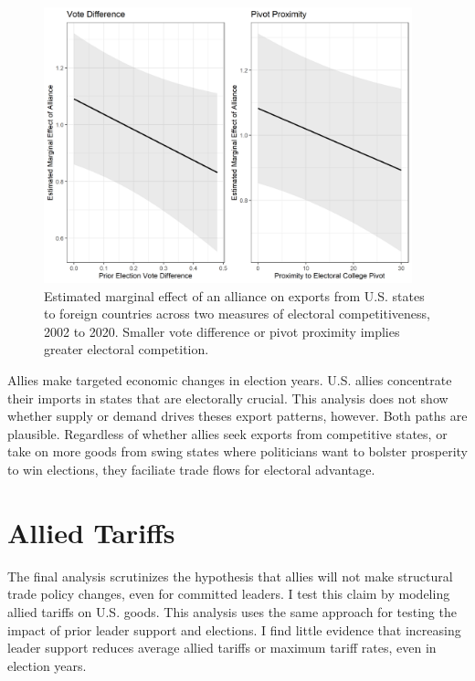 \documentclass[12pt]{article}
\begin{document}
\begin{figure}[htpb]
	\centering
		\includegraphics[width=0.95\textwidth]{../figures/me-all-state.png}
	\caption{Estimated marginal effect of an alliance on exports from U.S. states to foreign countries across two measures of electoral competitiveness, 2002 to 2020. Smaller vote difference or pivot proximity implies greater electoral competition.}
	\label{fig:me-all-state}
\end{figure}


Allies make targeted economic changes in election years. 
U.S. allies concentrate their imports in states that are electorally crucial.
This analysis does not show whether supply or demand drives theses export patterns, however. 
Both paths are plausible. 
Regardless of whether allies seek exports from competitive states, or take on more goods from swing states where politicians want to bolster prosperity to win elections, they faciliate trade flows for electoral advantage. 



\section{Allied Tariffs} 


The final analysis scrutinizes the hypothesis that allies will not make structural trade policy changes, even for committed leaders. 
I test this claim by modeling allied tariffs on U.S. goods.
This analysis uses the same approach for testing the impact of prior leader support and elections. 
I find little evidence that increasing leader support reduces average allied tariffs or maximum tariff rates, even in election years.
\end{document}
